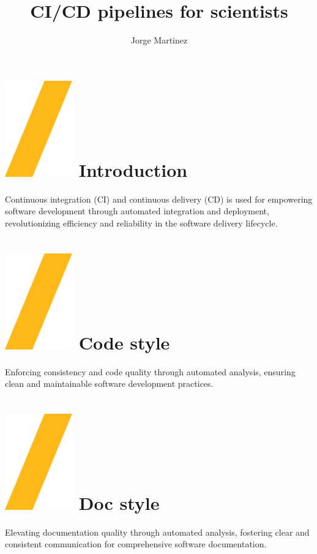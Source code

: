 \documentclass[a0paper,fleqn]{src/betterposter}
\begin{document}
{{}

}{

\title{CI\slash CD pipelines for scientists}
\author{Jorge Martinez}

\section{\includegraphics[height=\fontcharht\font`\S]{img/general/slash.png} Introduction}
Continuous integration (CI) and continuous delivery (CD) is used for empowering
software development through automated integration and deployment,
revolutionizing efficiency and reliability in the software delivery lifecycle.

\section{\includegraphics[height=\fontcharht\font`\S]{img/general/slash.png} Code style}
Enforcing consistency and code quality through automated analysis, ensuring
clean and maintainable software development practices.

\section{\includegraphics[height=\fontcharht\font`\S]{img/general/slash.png} Doc style}
Elevating documentation quality through automated analysis, fostering clear and
consistent communication for comprehensive software documentation.

}
\end{document}
